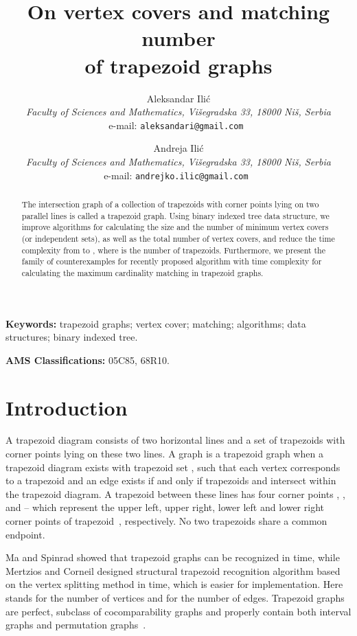 \documentclass[11pt,letter]{article}
\title {
    \bf {On vertex covers and matching number \\ of trapezoid graphs}
}
\author
{
{\large \sc Aleksandar Ili\' c \footnotemark[3]} \\
{\em \normalsize Faculty of Sciences and Mathematics, Vi\v segradska 33, 18000 Ni\v s, Serbia} \\
{\normalsize e-mail: { \tt aleksandari@gmail.com }}
\and
{\large \sc Andreja Ili\' c} \\
{\em \normalsize Faculty of Sciences and Mathematics, Vi\v segradska 33, 18000 Ni\v s, Serbia} \\
{\normalsize e-mail: { \tt andrejko.ilic@gmail.com }} }
\begin{document}
\maketitle


\begin{abstract}
The intersection graph of a collection of trapezoids with corner points lying on two parallel lines
is called a trapezoid graph. Using binary indexed tree data structure, we improve algorithms for
calculating the size and the number of minimum vertex covers (or independent sets), as well as the
total number of vertex covers, and reduce the time complexity from  to ,
where  is the number of trapezoids. Furthermore, we present the family of counterexamples for
recently proposed algorithm with time complexity  for calculating the maximum cardinality
matching in trapezoid graphs.
\end{abstract}

{\bf {Keywords:}} trapezoid graphs; vertex cover; matching; algorithms; data structures; binary
indexed tree. \vspace{0.2cm}

{{\bf AMS Classifications:} 05C85, 68R10.} \vspace{0.2cm}



\section{Introduction}


A trapezoid diagram consists of two horizontal lines and a set of trapezoids with corner points
lying on these two lines. A graph  is a trapezoid graph when a trapezoid diagram exists
with trapezoid set , such that each vertex  corresponds to a trapezoid  and an
edge exists  if and only if trapezoids  and  intersect within the
trapezoid diagram. A trapezoid  between these lines has four corner points , ,
 and  -- which represent the upper left, upper right, lower left and lower right corner
points of trapezoid~, respectively. No two trapezoids share a common endpoint.

Ma and Spinrad \cite{MaSp94} showed that trapezoid graphs can be recognized in  time, while
Mertzios and Corneil \cite{MeCo09} designed structural trapezoid recognition algorithm based on the
vertex splitting method in  time, which is easier for implementation. Here 
stands for the number of vertices and  for the number of edges. Trapezoid graphs are perfect,
subclass of cocomparability graphs and properly contain both interval graphs and permutation
graphs~\cite{Li07}.
\end{document}
